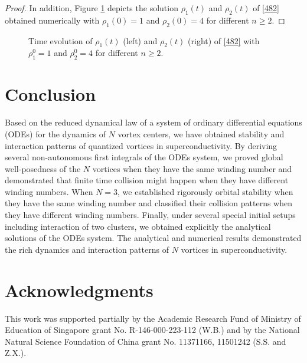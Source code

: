 \documentclass{aims}
\theoremstyle{plain}
\theoremstyle{definition}
\begin{document}
\begin{proof}
In addition,
Figure \ref{rho126} depicts the solution
$\rho_1(t)$ and $\rho_2(t)$ of \eqref{482} obtained numerically with $\rho_1(0)=1$ and $\rho_2(0)=4$ for different $n\ge2$.
\end{proof}

\begin{figure}[t!]
\centerline{
}
\caption{Time evolution of $\rho_1(t)$ (left) and $\rho_2(t)$ (right)
of \eqref{482} with $\rho_1^0=1$ and $\rho_2^0=4$ for different $n\ge2$.}
\label{rho126}
\end{figure}











\section{Conclusion}
Based on the reduced dynamical law of a system of ordinary differential
equations (ODEs) for the dynamics of $N$ vortex centers, we
have obtained stability and interaction patterns
of quantized vortices in superconductivity.
By deriving several non-autonomous first integrals of the
ODEs system, we proved  global well-posedness
of the $N$ vortices when they have the same winding number and
demonstrated that finite time collision might happen when they
have different winding numbers.
When $N=3$, we established rigorously
orbital stability when they have the same winding number
and classified their collision patterns when they have different
winding numbers. Finally, under several special initial setups
 including interaction of
two clusters, we obtained explicitly the analytical solutions
of the ODEs system. The analytical and numerical results demonstrated
the rich dynamics and interaction patterns of $N$ vortices in
superconductivity.





\section*{Acknowledgments}
This work was supported partially by the Academic Research
Fund of Ministry of Education of Singapore grant No.
R-146-000-223-112 (W.B.) and
by the National Natural Science Foundation of China grant No. 11371166,  11501242 (S.S. and Z.X.).
\end{document}
